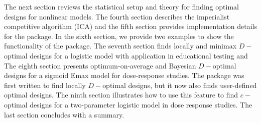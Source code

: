 The next section reviews the statistical setup and theory for finding optimal designs for  nonlinear models.
The fourth section describes the imperialist competitive algorithm (ICA) and the fifth section
provides  implementation details for  the   package.
In  the sixth section, %
we provide two examples to show the functionality of the   package. The seventh section %
finds locally and minimax $D-$optimal designs for a logistic model with  application in educational testing and
The eighth section presents optimum-on-average and Bayesian $D-$optimal designs for a sigmoid Emax model for dose-response studies.
The  package was first written to find locally  $D-$optimal designs, but it now also finds user-defined optimal designs.  %
The ninth section illustrates how to use this feature to find $c-$optimal designs for a two-parameter  logistic model in dose response studies.
The last section concludes with a summary.


